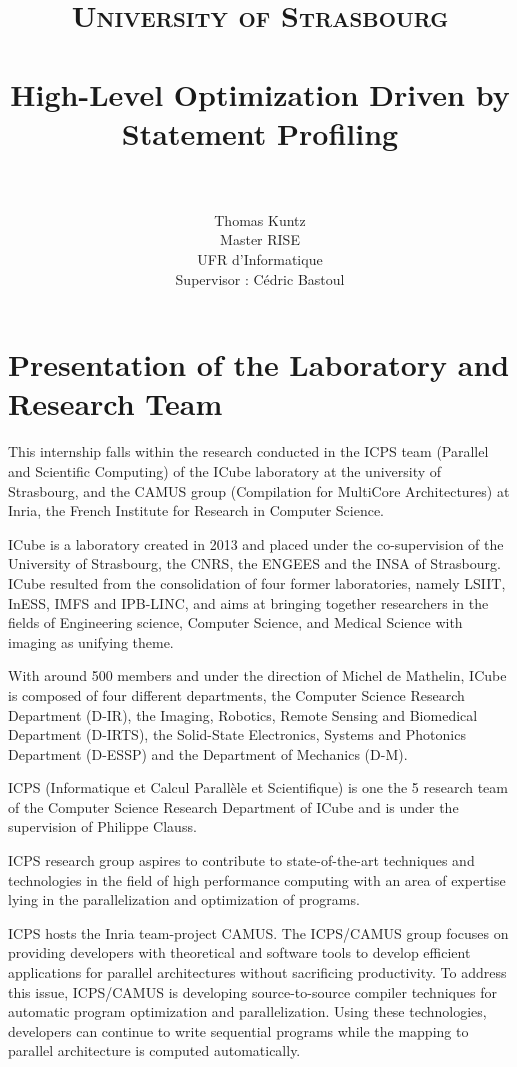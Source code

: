 \documentclass[paper=a4, fontsize=11.5pt]{scrartcl}
\title{
        \usefont{OT1}{bch}{b}{n}
        \normalfont \normalsize \textsc{University of Strasbourg} \\ [25pt]
        \horrule{0.5pt} \\[0.4cm]
        \huge High-Level Optimization Driven by Statement Profiling \\
        \horrule{2pt} \\[0.5cm]
}
\author{
        \normalfont                                 \Large
        Thomas Kuntz \\                                \normalsize
        Master RISE \\                                \normalsize
        UFR d'Informatique \\                                \normalsize
        Supervisor : Cédric Bastoul\\
}
\date{}
\numberwithin{equation}{section}        %
\numberwithin{figure}{section}          %
\numberwithin{table}{section}               %
\begin{document}

\maketitle
\thispagestyle{empty}

\clearpage

\tableofcontents
\clearpage

\section{Presentation of the Laboratory and Research Team}
This internship falls within the research conducted in the ICPS team (Parallel and Scientific
Computing) of the ICube laboratory at the university of Strasbourg, and the CAMUS group
(Compilation for MultiCore Architectures) at Inria, the French Institute for Research
in Computer Science.

\bigskip

ICube is a laboratory created in 2013 and placed under the co-supervision of the University of
Strasbourg, the CNRS, the ENGEES and the INSA of Strasbourg.
ICube resulted from the consolidation of four former laboratories, namely LSIIT, InESS, IMFS and IPB-LINC,
and aims at bringing together researchers in the fields of Engineering science, Computer Science,
and Medical Science with imaging as unifying theme.

With around 500 members and under the direction of Michel de Mathelin, ICube is composed of
four different departments, the Computer Science Research Department (D-IR), the
Imaging, Robotics, Remote Sensing and Biomedical Department (D-IRTS), the 
Solid-State Electronics, Systems and Photonics Department (D-ESSP) and the 
Department of Mechanics (D-M).

\bigskip

ICPS (Informatique et Calcul Parallèle et Scientifique)
is one the 5 research team of the Computer Science Research Department of ICube and is
under the supervision of Philippe Clauss.

ICPS research group aspires to contribute to state-of-the-art techniques and
technologies in the field of high performance computing with an area of expertise lying
in the parallelization and optimization of programs.

ICPS hosts the Inria team-project CAMUS.
The ICPS/CAMUS group focuses on providing developers with theoretical and software
tools to develop efficient applications for parallel architectures without sacrificing
productivity.
To address this issue, ICPS/CAMUS is developing source-to-source compiler techniques
for automatic program optimization and parallelization. Using these technologies,
developers can continue to write sequential programs while the mapping to parallel
architecture is computed automatically.
\end{document}
